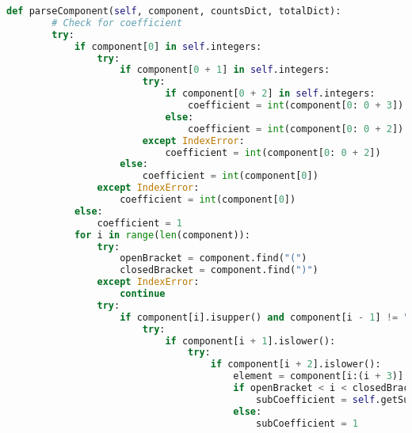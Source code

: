 \documentclass[a4paper,12pt]{article}
\begin{document}
\begin{lstlisting}[language=Python, caption=parseComponent method for finding elements]
def parseComponent(self, component, countsDict, totalDict):
        # Check for coefficient
        try:
            if component[0] in self.integers:
                try:
                    if component[0 + 1] in self.integers:
                        try:
                            if component[0 + 2] in self.integers:
                                coefficient = int(component[0: 0 + 3])
                            else:
                                coefficient = int(component[0: 0 + 2])
                        except IndexError:
                            coefficient = int(component[0: 0 + 2])
                    else:
                        coefficient = int(component[0])
                except IndexError:
                    coefficient = int(component[0])
            else:
                coefficient = 1
            for i in range(len(component)):
                try:
                    openBracket = component.find("(")
                    closedBracket = component.find(")")
                except IndexError:
                    continue
                try:
                    if component[i].isupper() and component[i - 1] != "(":
                        try:
                            if component[i + 1].islower():
                                try:
                                    if component[i + 2].islower():
                                        element = component[i:(i + 3)]
                                        if openBracket < i < closedBracket:
                                            subCoefficient = self.getSubCoefficient(component)
                                        else:
                                            subCoefficient = 1


\end{lstlisting}
\end{document}
